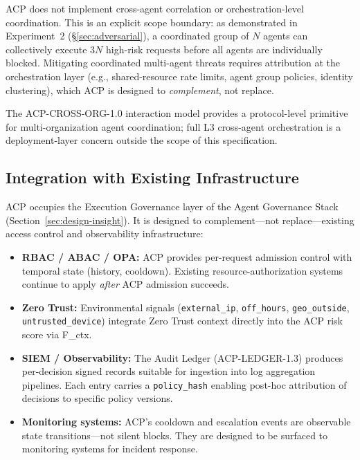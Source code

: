 \documentclass[11pt]{article}
\theoremstyle{definition}
\begin{document}
ACP does not implement cross-agent correlation or orchestration-level coordination.
This is an explicit scope boundary: as demonstrated in Experiment~2 (§\ref{sec:adversarial}),
a coordinated group of $N$ agents can collectively execute $3N$ high-risk requests before
all agents are individually blocked.
Mitigating coordinated multi-agent threats requires attribution at the orchestration layer
(e.g., shared-resource rate limits, agent group policies, identity clustering),
which ACP is designed to \emph{complement}, not replace.

The ACP-CROSS-ORG-1.0 interaction model provides a protocol-level primitive for
multi-organization agent coordination; full L3 cross-agent orchestration is
a deployment-layer concern outside the scope of this specification.

\subsection{Integration with Existing Infrastructure}

ACP occupies the Execution Governance layer of the Agent Governance Stack
(Section~\ref{sec:design-insight}).
It is designed to complement---not replace---existing access control and
observability infrastructure:

\begin{itemize}[noitemsep]
  \item \textbf{RBAC / ABAC / OPA:} ACP provides per-request admission control with
    temporal state (history, cooldown). Existing resource-authorization systems
    continue to apply \emph{after} ACP admission succeeds.
  \item \textbf{Zero Trust:} Environmental signals (\texttt{external\_ip},
    \texttt{off\_hours}, \texttt{geo\_outside}, \texttt{untrusted\_device})
    integrate Zero Trust context directly into the ACP risk score via F\_ctx.
  \item \textbf{SIEM / Observability:} The Audit Ledger (ACP-LEDGER-1.3) produces
    per-decision signed records suitable for ingestion into log aggregation pipelines.
    Each entry carries a \texttt{policy\_hash} enabling post-hoc attribution of
    decisions to specific policy versions.
  \item \textbf{Monitoring systems:} ACP's cooldown and escalation events are
    observable state transitions---not silent blocks. They are designed to be
    surfaced to monitoring systems for incident response.
\end{itemize}
\end{document}
